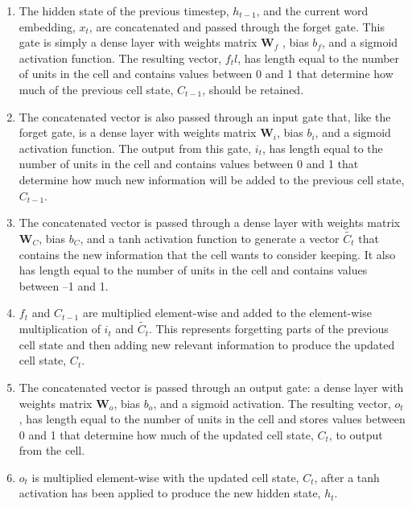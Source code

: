 \begin{enumerate}
	\item The hidden state of the previous timestep, \( h_{t-1} \), and the current word embedding, \( x_t \), are concatenated and passed through the forget gate.
	      This gate is simply a dense layer with weights matrix  \( \mathbf{W}_{f}\) , bias \( b_f \), and a sigmoid activation function.
	      The resulting vector, \( f_tl \), has length equal to the number of units in the cell and contains values between 0 and 1 that determine how much of the previous cell state, \( C_{t-1}\), should be retained.

	\item The concatenated vector is also passed through an input gate that, like the forget gate, is a dense layer with weights matrix \( \mathbf{W}_i\), bias \( b_i \), and a sigmoid activation function.
	      The output from this gate, \( i_t \), has length equal to the number of units in the cell and contains values between 0 and 1 that determine how much new information will be added to the previous cell state, \( C_{t-1}\).

	\item The concatenated vector is passed through a dense layer with weights matrix \( \mathbf{W}_C \), bias \( b_C \), and a tanh activation function to generate a vector \( \tilde{C_t} \) that contains the new information that the cell wants to consider keeping.
	      It also has length equal to the number of units in the cell and contains values between –1 and 1.

	\item \( f_t \) and \( C_{t-1} \) are multiplied element-wise and added to the element-wise multiplication of \( i_t \) and \( \tilde{C_t}\).
	      This represents forgetting parts of the previous cell state and then adding new relevant information to produce the updated cell state, \( C_t \).

	\item The concatenated vector is passed through an output gate: a dense layer with weights matrix \( \mathbf{W}_o \), bias \( b_o \), and a sigmoid activation.
	      The resulting vector, \( o_t \), has length equal to the number of units in the cell and stores values between 0 and 1 that determine how much of the updated cell state, \( C_t \), to output from the cell.

	\item \( o_t\) is multiplied element-wise with the updated cell state, \( C_t \), after a tanh activation has been applied to produce the new hidden state, \( h_t \).
\end{enumerate}

